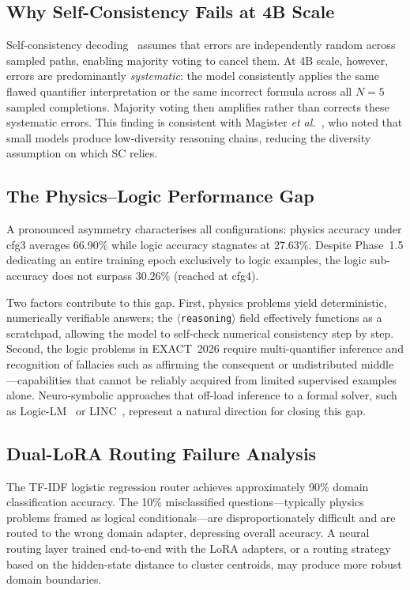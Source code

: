 \documentclass{ieeeaccess}
\newcommand{\dataset}{EXACT~2026}
\begin{document}
\subsection{Why Self-Consistency Fails at 4B Scale}

Self-consistency decoding~\cite{b2} assumes that errors are independently
random across sampled paths, enabling majority voting to cancel them.
At 4B scale, however, errors are predominantly \emph{systematic}: the
model consistently applies the same flawed quantifier interpretation or
the same incorrect formula across all $N=5$ sampled completions.
Majority voting then amplifies rather than corrects these systematic errors.
This finding is consistent with Magister \emph{et al.}~\cite{b24}, who
noted that small models produce low-diversity reasoning chains, reducing
the diversity assumption on which SC relies.

\subsection{The Physics--Logic Performance Gap}

A pronounced asymmetry characterises all configurations: physics accuracy
under cfg3 averages 66.90\% while logic accuracy stagnates at 27.63\%.
Despite Phase~1.5 dedicating an entire training epoch exclusively to
logic examples, the logic sub-accuracy does not surpass 30.26\%
(reached at cfg4).

Two factors contribute to this gap.
First, physics problems yield deterministic, numerically verifiable answers;
the $\langle$\texttt{reasoning}$\rangle$ field effectively functions as a
scratchpad, allowing the model to self-check numerical consistency step
by step.
Second, the logic problems in \dataset{} require multi-quantifier inference
and recognition of fallacies such as affirming the consequent or
undistributed middle---capabilities that cannot be reliably acquired from
limited supervised examples alone.
Neuro-symbolic approaches that off-load inference to a formal solver,
such as Logic-LM~\cite{b12} or LINC~\cite{b27}, represent a natural
direction for closing this gap.

\subsection{Dual-LoRA Routing Failure Analysis}

The TF-IDF logistic regression router achieves approximately 90\%
domain classification accuracy.
The 10\% misclassified questions---typically physics problems framed as
logical conditionals---are disproportionately difficult and are routed
to the wrong domain adapter, depressing overall accuracy.
A neural routing layer trained end-to-end with the LoRA adapters, or a
routing strategy based on the hidden-state distance to cluster centroids,
may produce more robust domain boundaries.
\end{document}
